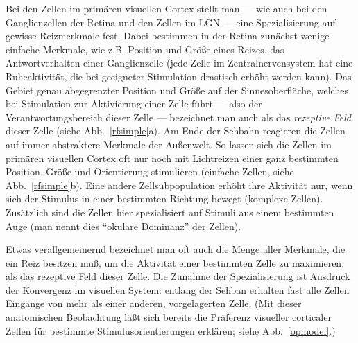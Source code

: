 Bei den Zellen im primären visuellen Cortex stellt man --- wie auch bei
den Ganglienzellen der Retina und den Zellen im LGN --- eine
Spezialisierung auf gewisse Reizmerkmale fest.  Dabei bestimmen in der
Retina zunächst wenige einfache Merkmale, wie z.B.  Position und Größe
eines Reizes, das Antwortverhalten einer Ganglienzelle (jede Zelle im
Zentralnervensystem hat eine Ruheaktivität, die bei geeigneter Stimulation
drastisch erhöht werden kann).  Das Gebiet genau abgegrenzter Position und
Größe auf der Sinnesoberfläche, welches bei Stimulation zur Aktivierung
einer Zelle führt --- also der Verantwortungsbereich dieser Zelle ---
bezeichnet man auch als das \emph{rezeptive Feld} dieser Zelle (siehe
Abb.~\ref{rfsimple}a).  Am Ende der Sehbahn reagieren die Zellen auf immer
abstraktere Merkmale der Außenwelt.  So lassen sich die Zellen im
primären visuellen Cortex oft nur noch mit Lichtreizen einer ganz
bestimmten Position, Größe und Orientierung stimulieren (einfache Zellen,
siehe Abb.~\ref{rfsimple}b).  Eine andere Zellsubpopulation erhöht ihre
Aktivität nur, wenn sich der Stimulus in einer bestimmten Richtung bewegt
(komplexe Zellen).  Zusätzlich sind die Zellen hier spezialisiert auf
Stimuli aus einem bestimmten Auge (man nennt dies ``okulare Dominanz'' der
Zellen).

Etwas verallgemeinernd bezeichnet man oft auch die Menge aller Merkmale,
die ein Reiz besitzen muß, um die Aktivität einer bestimmten Zelle zu
maximieren, als das rezeptive Feld dieser Zelle.  Die Zunahme der
Spezialisierung ist Ausdruck der Konvergenz im visuellen System: entlang
der Sehban erhalten fast alle Zellen Eingänge von mehr als einer anderen,
vorgelagerten Zelle. (Mit dieser anatomischen Beobachtung läßt sich
bereits die Präferenz visueller corticaler Zellen für bestimmte
Stimulusorientierungen erklären; siehe Abb.~\ref{opmodel}.)

